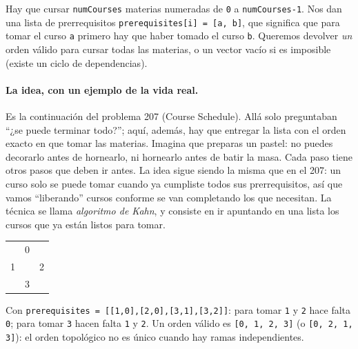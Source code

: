 
Hay que cursar \texttt{numCourses} materias numeradas de \texttt{0} a
\texttt{numCourses-1}. Nos dan una lista de prerrequisitos
\texttt{prerequisites[i] = [a, b]}, que significa que para tomar el curso
\texttt{a} primero hay que haber tomado el curso \texttt{b}. Queremos
devolver \emph{un} orden válido para cursar todas las materias, o un vector
vacío si es imposible (existe un ciclo de dependencias).

\paragraph{La idea, con un ejemplo de la vida real.} Es la continuación del
problema 207 (Course Schedule). Allá solo preguntaban ``¿se puede terminar
todo?''; aquí, además, hay que entregar la lista con el orden exacto en que
tomar las materias. Imagina que preparas un pastel: no puedes decorarlo antes de
hornearlo, ni hornearlo antes de batir la masa. Cada paso tiene otros pasos que
deben ir antes. La idea sigue siendo la misma que en el 207: un curso solo se
puede tomar cuando ya cumpliste todos sus prerrequisitos, así que vamos
``liberando'' cursos conforme se van completando los que necesitan. La técnica
se llama \emph{algoritmo de Kahn}, y consiste en ir apuntando en una lista los
cursos que ya están listos para tomar.

\begin{center}
\ttfamily
\begin{tabular}{ccc}
 & 0 & \\
1 & & 2\\
 & 3 & \\
\end{tabular}
\end{center}

\noindent Con \texttt{prerequisites = [[1,0],[2,0],[3,1],[3,2]]}: para tomar
\texttt{1} y \texttt{2} hace falta \texttt{0}; para tomar \texttt{3} hacen
falta \texttt{1} y \texttt{2}. Un orden válido es \texttt{[0, 1, 2, 3]} (o
\texttt{[0, 2, 1, 3]}): el orden topológico no es único cuando hay ramas
independientes.

